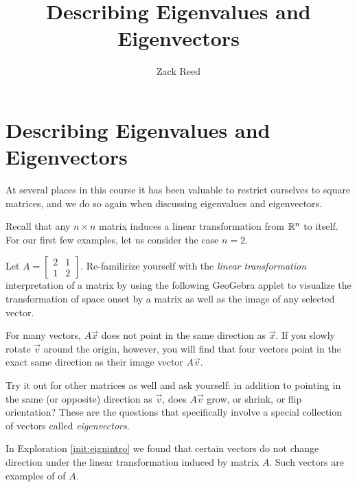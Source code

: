 \documentclass{ximera}
\author{Zack Reed}
\title{Describing Eigenvalues and Eigenvectors}
\begin{document}
\begin{abstract}

\end{abstract}
\maketitle


\section*{Describing Eigenvalues and Eigenvectors}

    
At several places in this course it has been valuable to restrict ourselves to square matrices, and we do so again when discussing eigenvalues and eigenvectors. 
    
Recall that any $n \times n$  matrix induces a linear transformation from $\mathbb{R}^n$ to itself.  For our first few examples, let us consider the case $n = 2$.
    
\begin{exploration}\label{init:eignintro}
Let $A=\begin{bmatrix} 2& 1\\ 1&2
\end{bmatrix}$. Re-familirize yourself with the \emph{linear transformation} interpretation of a matrix by using the following GeoGebra applet to visualize the transformation of space onset by a matrix as well as the image of any selected vector. 

\begin{center}
\end{center}
    
    For many vectors, $A\vec{x}$ does not point in the same direction as $\vec{x}$. If you slowly rotate $\vec{v}$ around the origin, however, you will find that four vectors point in the exact same direction as their image vector $A\vec{v}$.

    Try it out for other matrices as well and ask yourself: in addition to pointing in the same (or opposite) direction as $\vec{v}$, does $A\vec{v}$ grow, or shrink, or flip orientation? These are the questions that specifically involve a special collection of vectors called \emph{eigenvectors}.
    

\end{exploration}
    
In Exploration \ref{init:eignintro} we found that certain vectors do not change direction under the linear transformation induced by matrix $A$.  Such vectors are examples of  of $A$.
    
\end{document}
